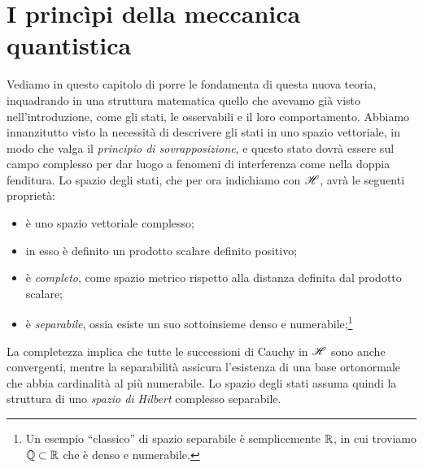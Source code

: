 \chapter{I princ\`ipi della meccanica quantistica}
Vediamo in questo capitolo di porre le fondamenta di questa nuova teoria, inquadrando in una struttura matematica quello che avevamo già visto nell'introduzione, come gli stati, le osservabili e il loro comportamento.
Abbiamo innanzitutto visto la necessità di descrivere gli stati in uno spazio vettoriale, in modo che valga il \emph{principio di sovrapposizione}, e questo stato dovrà essere sul campo complesso per dar luogo a fenomeni di interferenza come nella doppia fenditura.
Lo spazio degli stati, che per ora indichiamo con $\mathscr H$, avrà le seguenti proprietà:
\begin{itemize}
	\item è uno spazio vettoriale complesso;
	\item in esso è definito un prodotto scalare definito positivo;
	\item è \emph{completo}, come spazio metrico rispetto alla distanza definita dal prodotto scalare;
	\item è \emph{separabile}, ossia esiste un suo sottoinsieme denso e numerabile;\footnote{Un esempio ``classico'' di spazio separabile è semplicemente $\mathbb{R}$, in cui troviamo $\mathbb{Q}\subset\mathbb{R}$ che è denso e numerabile.} 
\end{itemize}
La completezza implica che tutte le successioni di Cauchy in $\mathscr H$ sono anche convergenti, mentre la separabilità assicura l'esistenza di una base ortonormale che abbia cardinalità al più numerabile.
Lo spazio degli stati assuma quindi la struttura di uno \emph{spazio di Hilbert} complesso separabile.

